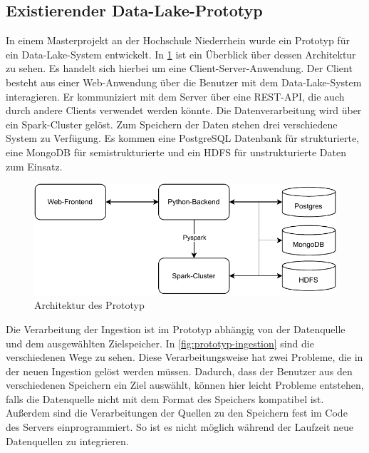 \subsection{Existierender Data-Lake-Prototyp}
In einem Masterprojekt an der Hochschule Niederrhein \parencite{prototyp} wurde ein Prototyp für ein Data-Lake-System entwickelt.
In \cref{fig:prototyp-architektur} ist ein Überblick über dessen Architektur zu sehen.
Es handelt sich hierbei um eine Client-Server-Anwendung.
Der Client besteht aus einer Web-Anwendung über die Benutzer mit dem Data-Lake-System interagieren.
Er kommuniziert mit dem Server über eine REST-API, die auch durch andere Clients verwendet werden könnte.
Die Datenverarbeitung wird über ein Spark-Cluster gelöst.
Zum Speichern der Daten stehen drei verschiedene System zu Verfügung.
Es kommen eine PostgreSQL Datenbank für strukturierte, eine MongoDB für semistrukturierte und ein HDFS für unstrukturierte Daten zum Einsatz.

\begin{figure}
    \centering
    \includegraphics{Grafiken/Prototyp-Architektur.pdf}
    \caption[Architektur des Prototyp]{Architektur des Prototyp}
    \label{fig:prototyp-architektur}
\end{figure}

Die Verarbeitung der Ingestion ist im Prototyp abhängig von der Datenquelle und dem ausgewählten Zielspeicher.
In \cref{fig:prototyp-ingestion}  sind die verschiedenen Wege zu sehen.
Diese Verarbeitungsweise hat zwei Probleme, die in der neuen Ingestion gelöst werden müssen.
Dadurch, dass der Benutzer aus den verschiedenen Speichern ein Ziel auswählt, können hier leicht Probleme entstehen, falls die Datenquelle nicht mit dem Format des Speichers kompatibel ist.
Außerdem sind die Verarbeitungen der Quellen zu den Speichern fest im Code des Servers einprogrammiert.
So ist es nicht möglich während der Laufzeit neue Datenquellen zu integrieren.


